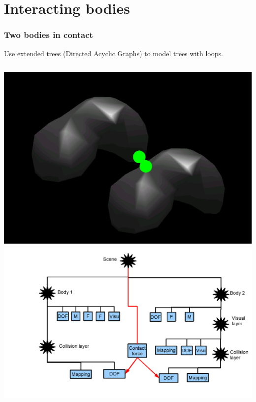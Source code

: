\documentclass[a4paper,compress]{beamer}
\begin{document}
\section{Interacting bodies}

\begin{frame}
\frametitle{Two bodies in contact}
Use extended trees (Directed Acyclic Graphs) to model trees with loops.
\begin{columns}
\includegraphics[width=\linewidth]{livers-contact.png}
\includegraphics[width=\linewidth]{livers-contact-tree.png}
\end{columns}
\end{frame}
\end{document}
